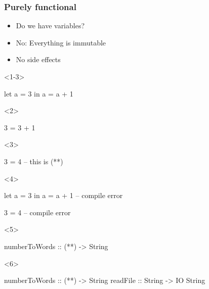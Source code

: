 \documentclass[17pt]{beamer}
\renewcommand{\(}[1]{\begin{columns}[#1]}
\renewcommand{\)}{\end{columns}}
\newcommand{\<}[1]{\begin{column}{#1}}
\renewcommand{\>}{\end{column}}
\begin{document}
\begin{frame}[fragile]
  \frametitle{Purely functional}
  \begin{minipage}[t][.2\textheight]{\textwidth}
  \begin{itemize}
    \item<1-> Do we have variables?
    \item<4-> {\color{google-r}No}: Everything is immutable
    \item<5-> No side effects
  \end{itemize}
  \end{minipage}
  \begin{minipage}[c][.5\textheight]{\textwidth}
  \begin{center}
    \begin{onlyenv}<1-3>
      \begin{code}
let a = 3
in  a = a + 1
      \end{code}
    \end{onlyenv}
    \begin{onlyenv}<2>
      \begin{code}[eval]
3 = 3 + 1
      \end{code}
    \end{onlyenv}
    \begin{onlyenv}<3>
      \begin{code}[eval]
3 = 4 -- this is (*\color{google-r}{bad}*)
      \end{code}
    \end{onlyenv}
    \begin{onlyenv}<4>
      \begin{code}
let a = 3
in  a = a + 1 -- compile error
      \end{code}
      \begin{code}[eval]
3 = 4 -- compile error
      \end{code}
    \end{onlyenv}
    \begin{onlyenv}<5>
      \begin{code}
numberToWords :: (**) -> String
      \end{code}
    \end{onlyenv}
    \begin{onlyenv}<6>
      \begin{code}
numberToWords :: (**) -> String
readFile :: String -> IO String
      \end{code}
    \end{onlyenv}
  \end{center}
  \end{minipage}
\end{frame}
\end{document}
